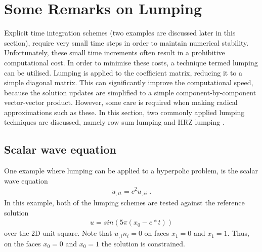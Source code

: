 
%
%
%


\section{Some Remarks on Lumping}
\label{LUMPING}

Explicit time integration schemes (two examples are discussed later in this 
section), require very small time steps in order to maintain numerical stability. 
Unfortunately, these small time increments often result in a prohibitive 
computational cost. 
In order to minimise these costs, a technique termed lumping can be utilised.
Lumping is applied to the coefficient matrix, reducing it to a simple diagonal 
matrix. This can significantly improve the computational speed, because the 
solution updates are simplified to a simple component-by-component 
vector-vector product. However, some care is required when making radical
approximations such as these. In this section, two commonly applied lumping
techniques are discussed, namely row sum lumping 
 and HRZ 
lumping .

\subsection{Scalar wave equation}
One example where lumping can be applied to a hyperpolic problem, is  
the scalar wave equation
\begin{eqnarray} \label{LUMPING WAVE} 
u_{,tt}=c^2 u_{,ii} \; .
\end{eqnarray}
In this example, both of the lumping schemes are tested against the reference solution
\begin{eqnarray} \label{LUMPING WAVE TEST} 
u=sin(5 \pi (x_0-c*t) )
\end{eqnarray}
over the 2D unit square. Note that $u_{,i}n_i=0$ on faces $x_1=0$ and $x_1=1$.
Thus, on the faces $x_0=0$ and $x_0=1$ the solution is constrained.

